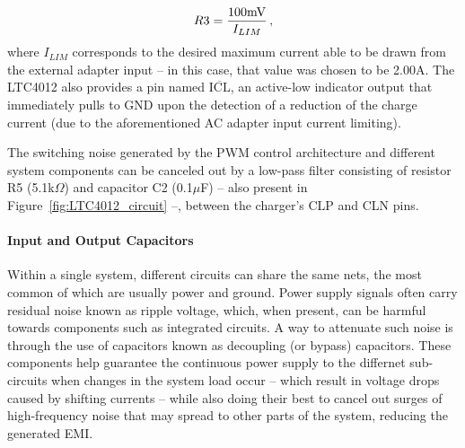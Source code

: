 \begin{equation}\label{eq:r_cl}
    R3=\frac{100\textrm{mV}}{I_{LIM}}\,,\medskip
\end{equation}
where $I_{LIM}$ corresponds to the desired maximum current able to be drawn from the external adapter input -- in this case, that value was chosen to be 2.00A. The LTC4012 also provides a pin named $\overline{\mbox{ICL}}$, an active-low indicator output that immediately pulls to GND upon the detection of a reduction of the charge current (due to the aforementioned AC adapter input current limiting).

The switching noise generated by the PWM control architecture and different system components can be canceled out by a low-pass filter consisting of resistor R5 (5.1k$\Omega$) and capacitor C2 (0.1$\mu$F) -- also present in Figure~\ref{fig:LTC4012_circuit} --, between the charger's CLP and CLN pins.


\paragraph{Input and Output Capacitors}	Within a single system, different circuits can share the same nets, the most common of which are usually power and ground. Power supply signals often carry residual noise known as ripple voltage, which, when present, can be harmful towards components such as integrated circuits. A way to attenuate such noise is through the use of capacitors known as decoupling (or bypass) capacitors. These components help guarantee the continuous power supply to the differnet sub-circuits when changes in the system load occur -- which result in voltage drops caused by shifting currents -- while also doing their best to cancel out surges of high-frequency noise that may spread to other parts of the system, reducing the generated \gls{EMI}. 

